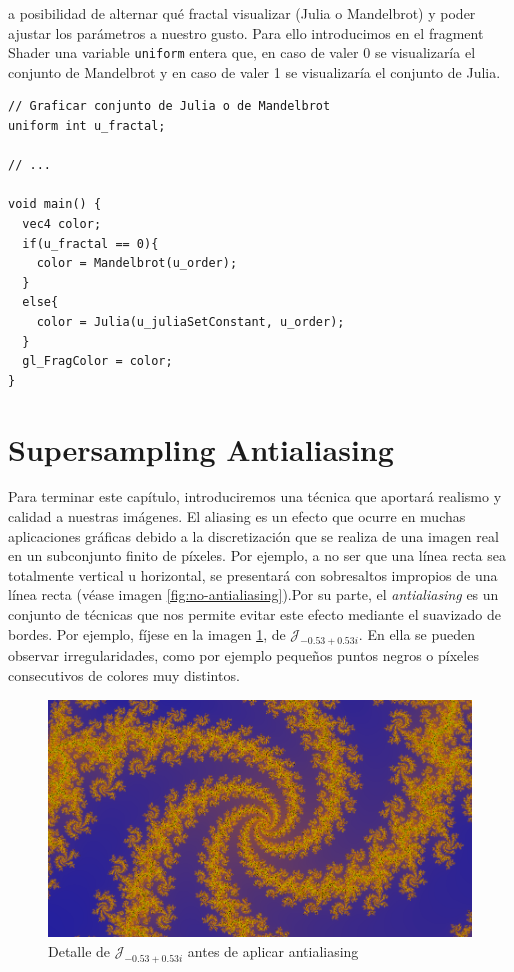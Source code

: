 a posibilidad de alternar qué fractal visualizar (Julia o Mandelbrot) y poder ajustar los parámetros a nuestro gusto. Para ello introducimos en el fragment Shader una variable \verb|uniform| entera que, en caso de valer 0 se visualizaría el conjunto de Mandelbrot y en caso de valer 1 se visualizaría el conjunto de Julia.

\begin{lstlisting}
// Graficar conjunto de Julia o de Mandelbrot
uniform int u_fractal;

// ... 

void main() {
  vec4 color;
  if(u_fractal == 0){
    color = Mandelbrot(u_order);
  }
  else{
    color = Julia(u_juliaSetConstant, u_order);
  }
  gl_FragColor = color;
}
\end{lstlisting}

\section{Supersampling Antialiasing}
\label{section:SSAA-2D}

Para terminar este capítulo, introduciremos una técnica que aportará realismo y calidad a nuestras imágenes. El aliasing es un efecto que ocurre en muchas aplicaciones gráficas debido a la discretización que se realiza de una imagen real en un subconjunto finito de píxeles. Por ejemplo, a no ser que una línea recta sea totalmente vertical u horizontal, se presentará con sobresaltos impropios de una línea recta (véase imagen \ref{fig:no-antialiasing}).Por su parte, el \textit{antialiasing} es un conjunto de técnicas que nos permite evitar este efecto mediante el suavizado de bordes. Por ejemplo, fíjese en la imagen \ref{fig:no-antialiasing-2D}, de $\mathcal{J}_{-0.53 + 0.53i}$. En ella se pueden observar irregularidades, como por ejemplo pequeños puntos negros o píxeles consecutivos de colores muy distintos.

\begin{figure} [ht]
  \centering
  \includegraphics[width=130mm]{img/C6/no-antialiasing.png}
  \caption{Detalle de $\mathcal{J}_{-0.53 + 0.53i}$ antes de aplicar antialiasing}
  \label{fig:no-antialiasing-2D}
\end{figure}

